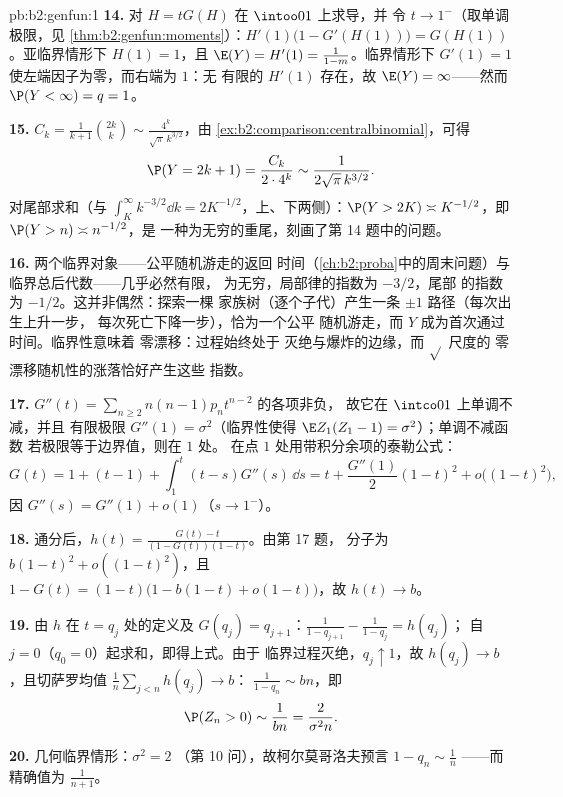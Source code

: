 \begin{solution}{pb:b2:genfun:1}
\textbf{14.} 对 $H = tG(H)$ 在 $\intoo01$ 上求导，并
令 $t \to 1^-$（取单调极限，见
\cref{thm:b2:genfun:moments}）：$H'(1)\bigl(1 - G'(H(1))\bigr)
= G(H(1))$。亚临界情形下 $H(1) = 1$，且 $\E(Y) =
H'(1) = \frac1{1 - m}$。临界情形下 $G'(1) = 1$
使左端因子为零，而右端为 $1$：无
有限的 $H'(1)$ 存在，故 $\E(Y) = \infty$——然而 $\P(Y <
\infty) = q = 1$。

\textbf{15.} $C_k = \frac1{k+1}\binom{2k}k \sim
\frac{4^k}{\sqrt\pi\,k^{3/2}}$，由
\cref{ex:b2:comparison:centralbinomial}，可得
\[
\P(Y = 2k+1) = \frac{C_k}{2\cdot4^{k}} \sim
\frac1{2\sqrt\pi\,k^{3/2}} .
\]
对尾部求和（与 $\int_K^\infty
k^{-3/2}\dd k = 2K^{-1/2}$，上、下两侧）：$\P(Y > 2K)
\asymp K^{-1/2}$，即 $\P(Y > n) \asymp n^{-1/2}$，是
一种为无穷的重尾，刻画了第 14 题中的问题。

\textbf{16.} 两个临界对象——公平随机游走的返回
时间（\cref{ch:b2:proba}中的周末问题）与
临界总后代数——几乎必然有限，
为无穷，局部律的指数为 $-3/2$，尾部
的指数为 $-1/2$。这并非偶然：探索一棵
家族树（逐个子代）产生一条 $\pm1$ 路径（每次出生上升一步，
每次死亡下降一步），恰为一个公平
随机游走，而 $Y$ 成为首次通过时间。临界性意味着
零漂移：过程始终处于
灭绝与爆炸的边缘，而 $\sqrt{}$ 尺度的
零漂移随机性的涨落恰好产生这些
指数。

\textbf{17.} $G''(t) = \sum_{n\geq2}n(n-1)p_nt^{n-2}$ 的各项非负，
故它在 $\intco01$ 上单调不减，并且
有限极限 $G''(1) = \sigma^2$（临界性使得
$\E Z_1(Z_1 - 1) = \sigma^2$）；单调不减函数
若极限等于边界值，则在 $1$ 处。
在点 $1$ 处用带积分余项的泰勒公式：
\[
G(t) = 1 + (t - 1) + \int_1^t(t - s)G''(s)\,\dd s
= t + \frac{G''(1)}2(1-t)^2 + o\bigl((1-t)^2\bigr),
\]
因 $G''(s) = G''(1) + o(1)$（$s \to 1^-$）。

\textbf{18.} 通分后，$h(t) =
\frac{G(t) - t}{(1 - G(t))(1 - t)}$。由第 17 题，
分子为 $b(1-t)^2 + o((1-t)^2)$，且 $1 - G(t) = (1 -
t)\bigl(1 - b(1-t) + o(1-t)\bigr)$，故 $h(t) \to b$。

\textbf{19.} 由 $h$ 在 $t = q_j$ 处的定义及 $G(q_j) =
q_{j+1}$：$\frac1{1 - q_{j+1}} - \frac1{1-q_j} = h(q_j)$；
自 $j = 0$（$q_0 = 0$）起求和，即得上式。由于
临界过程灭绝，$q_j \uparrow 1$，故 $h(q_j) \to
b$，且切萨罗均值 $\frac1n\sum_{j<n}h(q_j) \to b$：
$\frac1{1-q_n} \sim bn$，即
\[
\P(Z_n > 0) \sim \frac1{bn} = \frac{2}{\sigma^2 n} .
\]

\textbf{20.} 几何临界情形：$\sigma^2 = 2$
（第 10 问），故柯尔莫哥洛夫预言 $1 - q_n \sim \frac1n$
——而精确值为 $\frac1{n+1}$。


\end{solution}
